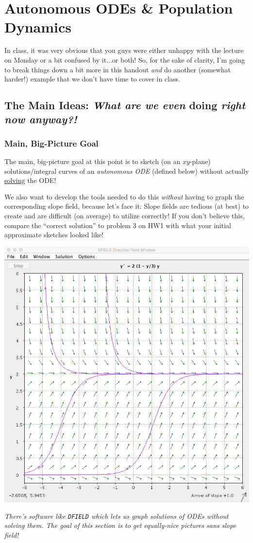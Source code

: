 \documentclass[12pt]{article}
\theoremstyle{definition}
\theoremstyle{underl}
\newcommand{\capt}[1]{\begin{adjustwidth}{0.5in}{0.5in}\centering\small\textit{#1}\end{adjustwidth}}
\begin{document}
	\section*{\centering Autonomous ODEs \& Population Dynamics}
	In class, it was very obvious that you guys were either unhappy with the lecture on Monday or a bit confused by it...or both! So, for the sake of clarity, I'm going to break things down a bit more in this handout \textit{and} do another (somewhat harder!) example that we don't have time to cover in class.
	
	\subsection*{The Main Ideas: \textit{What are we even }doing\textit{ right now anyway?!}}
	\subsubsection*{Main, Big-Picture Goal}
	The main, big-picture goal at this point is to sketch (on an $xy$-plane) solutions/integral curves of an \textit{autonomous ODE} (defined below) without actually \ul{solving} the ODE! 
	
	We also want to develop the tools needed to do this \textit{without} having to graph the corresponding slope field, because let's face it: Slope fields are tedious (at best) to create and are difficult (on average) to utilize correctly! If you don't believe this, compare the ``correct solution'' to problem 3 on HW1 with what your initial approximate sketches looked like!
	
	\begin{center}
		\includegraphics[scale=0.3175]{AutonomousSlope}
		
		\capt{There's software like \texttt{DFIELD} which lets us graph solutions of ODEs without solving them. The goal of this section is to get equally-nice pictures sans slope field!}
	\end{center}
	
\end{document}
